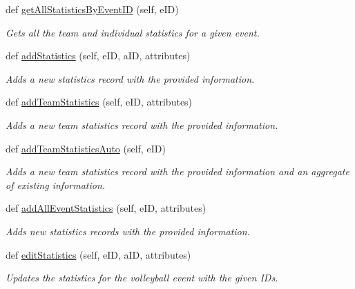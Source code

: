 \begin{DoxyCompactItemize}
def \hyperlink{classhandler_1_1volleyball__event_1_1_volleyball_event_handler_af0ca76458c344fc36594130a1506da2d}{get\+All\+Statistics\+By\+Event\+ID} (self, e\+ID)
\begin{DoxyCompactList}\small\item\em Gets all the team and individual statistics for a given event. \end{DoxyCompactList}\item 
def \hyperlink{classhandler_1_1volleyball__event_1_1_volleyball_event_handler_a0cda68c5c05c8daf2296234ae1c89e87}{add\+Statistics} (self, e\+ID, a\+ID, attributes)
\begin{DoxyCompactList}\small\item\em Adds a new statistics record with the provided information. \end{DoxyCompactList}\item 
def \hyperlink{classhandler_1_1volleyball__event_1_1_volleyball_event_handler_ab3e0e56e56998e7457d2e8114f87dda4}{add\+Team\+Statistics} (self, e\+ID, attributes)
\begin{DoxyCompactList}\small\item\em Adds a new team statistics record with the provided information. \end{DoxyCompactList}\item 
def \hyperlink{classhandler_1_1volleyball__event_1_1_volleyball_event_handler_a2917f27fd1a43abb715b4cf94199125a}{add\+Team\+Statistics\+Auto} (self, e\+ID)
\begin{DoxyCompactList}\small\item\em Adds a new team statistics record with the provided information and an aggregate of existing information. \end{DoxyCompactList}\item 
def \hyperlink{classhandler_1_1volleyball__event_1_1_volleyball_event_handler_a734329834b9e58469acd4f53b8a74504}{add\+All\+Event\+Statistics} (self, e\+ID, attributes)
\begin{DoxyCompactList}\small\item\em Adds new statistics records with the provided information. \end{DoxyCompactList}\item 
def \hyperlink{classhandler_1_1volleyball__event_1_1_volleyball_event_handler_a842f7dcd5852874aad1cf8ed07028d5e}{edit\+Statistics} (self, e\+ID, a\+ID, attributes)
\begin{DoxyCompactList}\small\item\em Updates the statistics for the volleyball event with the given I\+Ds. \end{DoxyCompactList}\item 

\end{DoxyCompactItemize}
